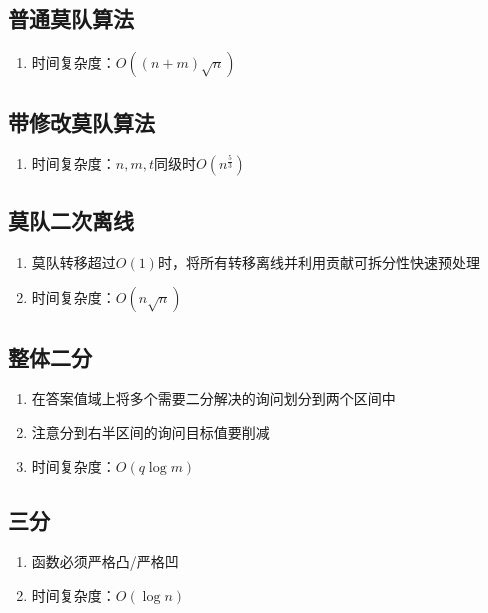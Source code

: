 \documentclass[twocolumn,a4,8pt]{article}  %
\begin{document}
		\subsection{普通莫队算法}
			\noindent\begin{enumerate}
				\item 时间复杂度：$O((n+m)\sqrt{n})$
			\end{enumerate}
	 	 	
	 	 	
	 	\subsection{带修改莫队算法}
			\noindent\begin{enumerate}
				\item 时间复杂度：$n,m,t$同级时$O(n^{\frac{5}{3}})$
			\end{enumerate}
	 	 	
	 	 	
	 	\subsection{莫队二次离线}
			\noindent\begin{enumerate}
				\item 莫队转移超过$O(1)$时，将所有转移离线并利用贡献可拆分性快速预处理
				\item 时间复杂度：$O(n\sqrt{n})$
			\end{enumerate}
	 	 	
	 	 	
	 	\subsection{整体二分}
			\noindent\begin{enumerate}
				\item 在答案值域上将多个需要二分解决的询问划分到两个区间中
				\item 注意分到右半区间的询问目标值要削减
				\item 时间复杂度：$O(q\log m)$
			\end{enumerate}
	 	 	
	 	 	
	 	\subsection{三分}
			\noindent\begin{enumerate}
				\item 函数必须严格凸/严格凹
				\item 时间复杂度：$O(\log n)$
			\end{enumerate}
	 	 	
	 	 	
\end{document}
